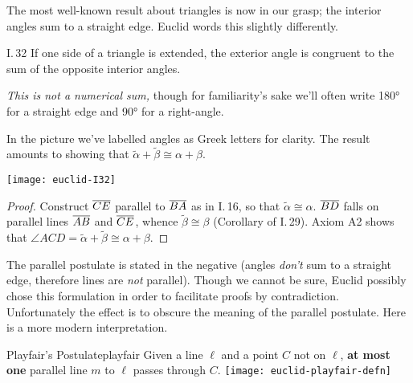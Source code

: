 The most well-known result about triangles is now in our grasp; the interior angles sum to a straight edge. Euclid words this slightly differently.

\begin{thm}{I.\,32}{}
	If one side of a triangle is extended, the exterior angle is congruent to the sum of the opposite interior angles.
\end{thm}

\begin{minipage}[t]{0.62\linewidth}\vspace{-4pt}
	\emph{This is not a numerical sum,} though for familiarity's sake we'll often write \ang{180} for a straight edge and \ang{90} for a right-angle.\par
	In the picture we've labelled angles as Greek letters for clarity. The result amounts to showing that $\widetilde\alpha+\widetilde\beta\cong\alpha+\beta$.
\end{minipage}
\hfill
\begin{minipage}[t]{0.37\linewidth}\vspace{-9pt}
	\flushright
	\texttt{[image: euclid-I32]}
\end{minipage}

\vspace{-20pt}

\begin{proof}
	Construct $\overline{CE}$ parallel to $\overline{BA}$ as in I.\,16, so that $\widetilde\alpha\cong\alpha$.\smallbreak
	$\overline{BD}$ falls on parallel lines $\overline{AB}$ and $\overline{CE}$, whence $\widetilde\beta\cong\beta$ (Corollary of I.\,29).\smallbreak
	Axiom A2 shows that $\angle ACD=\widetilde\alpha+\widetilde\beta\cong\alpha+\beta$.
\end{proof}


\medskip


The parallel postulate is stated in the negative (angles \emph{don't} sum to a straight edge, therefore lines are \emph{not} parallel). Though we cannot be sure, Euclid possibly chose this formulation in order to facilitate proofs by contradiction. Unfortunately the effect is to obscure the meaning of the parallel postulate. Here is a more modern interpretation.

\begin{axiom}[lower separated=false, sidebyside, sidebyside align=top seam, sidebyside gap=0pt, righthand width=0.37\linewidth]{Playfair's Postulate}{playfair}
	Given a line $\ell$ and a point $C$ not on $\ell$, \textbf{at most one} parallel line $m$ to $\ell$ passes through $C$.
	\tcblower
	\flushright
	\texttt{[image: euclid-playfair-defn]}
\end{axiom}


